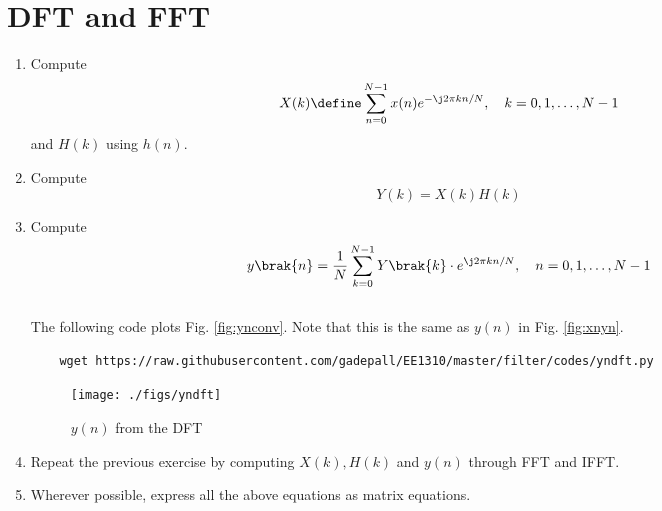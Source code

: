 \documentclass[journal,12pt,twocolumn]{IEEEtran}
\renewcommand\thesection{\arabic{section}}
\begin{document}
\section{DFT and FFT}
\begin{enumerate}[label=\thesection.\arabic*]
\item
Compute
\begin{equation}
	X(k) \define \sum _{n=0}^{N-1}x(n) e^{-\j2\pi kn/N}, \quad k = 0,1,\dots, N-1
\end{equation}
and $H(k)$ using $h(n)$.
\solution 
\item Compute 
\begin{equation}
	Y(k) = X(k)H(k)
\end{equation}
\item Compute
\begin{equation}
	y\brak{n}={\frac {1}{N}}\sum _{k=0}^{N-1}Y\brak{k}\cdot e^{\j 2\pi kn/N},\quad n = 0,1,\dots, N-1
\end{equation}
\\
\solution The following code plots Fig. \ref{fig:ynconv}. Note that this is the same as 
$y(n)$ in  Fig. 
\ref{fig:xnyn}. 
%
\begin{lstlisting}
	wget https://raw.githubusercontent.com/gadepall/EE1310/master/filter/codes/yndft.py
\end{lstlisting}
\begin{figure}[!ht]
	\centering
	\texttt{[image: ./figs/yndft]}
	\caption{$y(n)$ from the DFT}
	\label{fig:yndft}
\end{figure}
\item Repeat the previous exercise by computing $X(k), H(k)$ and $y(n)$ through FFT and 
IFFT.
\item Wherever possible, express all the above equations as matrix equations.
\end{enumerate}
%
\end{document}

